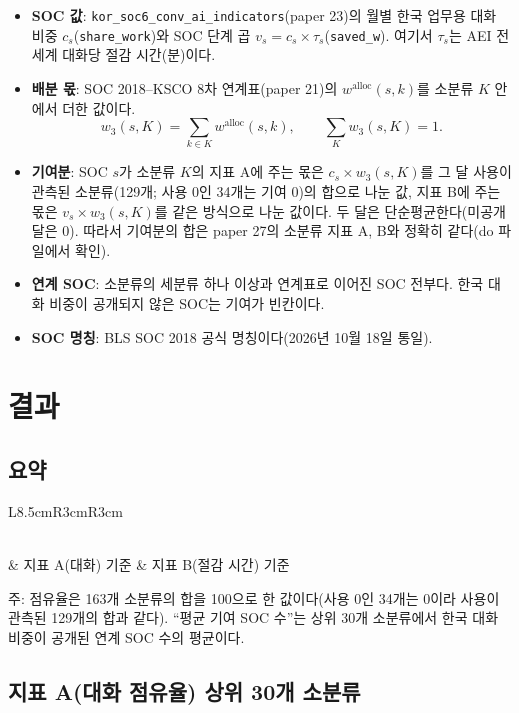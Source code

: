 \documentclass[11pt]{article}
\begin{document}
\begin{itemize}[leftmargin=*]
  \item \textbf{SOC 값}: \texttt{kor\_soc6\_conv\_ai\_indicators}(paper 23)의 월별 한국 업무용 대화 비중 $c_s$(\texttt{share\_work})와 SOC 단계 곱 $v_s = c_s \times \tau_s$(\texttt{saved\_w}). 여기서 $\tau_s$는 AEI 전 세계 대화당 절감 시간(분)이다.
  \item \textbf{배분 몫}: SOC 2018--KSCO 8차 연계표(paper 21)의 $w^{\text{alloc}}(s,k)$를 소분류 $K$ 안에서 더한 값이다.
    \[
      w_3(s,K) = \sum_{k \in K} w^{\text{alloc}}(s,k), \qquad \sum_K w_3(s,K) = 1.
    \]
  \item \textbf{기여분}: SOC $s$가 소분류 $K$의 지표 A에 주는 몫은 $c_s \times w_3(s,K)$를 그 달 사용이 관측된 소분류(129개; 사용 0인 34개는 기여 0)의 합으로 나눈 값, 지표 B에 주는 몫은 $v_s \times w_3(s,K)$를 같은 방식으로 나눈 값이다. 두 달은 단순평균한다(미공개 달은 0). 따라서 기여분의 합은 paper 27의 소분류 지표 A, B와 정확히 같다(do 파일에서 확인).
  \item \textbf{연계 SOC}: 소분류의 세분류 하나 이상과 연계표로 이어진 SOC 전부다. 한국 대화 비중이 공개되지 않은 SOC는 기여가 빈칸이다.
  \item \textbf{SOC 명칭}: BLS SOC 2018 공식 명칭이다(2026년 10월 18일 통일).
\end{itemize}

\section{결과}

\subsection{요약}

\begin{longtable}{L{8.5cm}R{3cm}R{3cm}}
\caption{상위 30개 소분류 요약}\label{tab:summary}\\
\toprule
 & 지표 A(대화) 기준 & 지표 B(절감 시간) 기준 \\
\midrule
\endfirsthead

\bottomrule
\end{longtable}

\noindent 주: 점유율은 163개 소분류의 합을 100으로 한 값이다(사용 0인 34개는 0이라 사용이 관측된 129개의 합과 같다). ``평균 기여 SOC 수''는 상위 30개 소분류에서 한국 대화 비중이 공개된 연계 SOC 수의 평균이다.

\subsection{지표 A(대화 점유율) 상위 30개 소분류}
\end{document}
